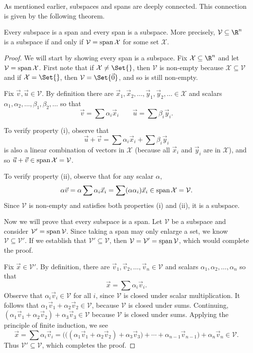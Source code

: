 As mentioned earlier, subspaces and spans are deeply connected.
This connection is given by the following theorem.

\begin{theorem}
	Every subspace is a span and every span is a subspace.  More precisely,
	$\mathcal V\subseteq \R^n$ is a subspace if and only if $\mathcal V=
	\operatorname{span}\mathcal X$ for some set $\mathcal X$.
\end{theorem}
\begin{proof}
	We will start by showing every span is a subspace.  Fix $\mathcal X\subseteq\R^n$
	and let
	$\mathcal V=\operatorname{span}\mathcal X$. First note that if $\mathcal X\neq \Set{}$, then $\mathcal V$
	is non-empty because $\mathcal X\subseteq\mathcal V$ and if $\mathcal X=\Set{}$, then $\mathcal V=\Set{\vec 0}$,
	and so is still non-empty.
	
	Fix $\vec v,\vec u\in\mathcal V$. By definition there are $\vec x_1,\vec x_2,\ldots,\vec y_1,\vec y_2,\ldots\in\mathcal X$ 
	and scalars $\alpha_1,\alpha_2,\ldots,\beta_1,\beta_2,\ldots$ so that
	\[
		\vec v=\sum \alpha_i\vec x_i\qquad \vec u=\sum\beta_i\vec y_i.
	\]

	To verify property (i), observe that
	\[
		\vec u+\vec v=\sum\alpha_i\vec x_i + \sum\beta_i\vec y_i
	\]
	is also a linear combination of vectors in $\mathcal X$ (because all $\vec x_i$ and $\vec y_i$
	are in $\mathcal X$), and so $\vec u+\vec v\in	\operatorname{span}\mathcal X=\mathcal V$.
	
	To verify property (ii), observe that for any scalar $\alpha$, 
	\[
		\alpha\vec v=\alpha\sum \alpha_i\vec x_i = \sum (\alpha\alpha_i)\vec x_i\in
		\operatorname{span}\mathcal X=\mathcal V.
	\]
	Since $\mathcal V$ is non-empty and satisfies both properties (i) and (ii), it is a subspace.

	Now we will prove that every subspace is a span. Let $\mathcal V$ be a subspace
	and consider $\mathcal V'=\operatorname{span}\mathcal V$.  Since taking a span may only enlarge a set, we know
	$\mathcal V\subseteq \mathcal V'$. If we establish that $\mathcal V'\subseteq\mathcal V$,
	then $\mathcal V=\mathcal V'=\operatorname{span}\mathcal V$, which would complete the proof.

	Fix $\vec x\in\mathcal V'$. By definition, there are $\vec v_1,\vec v_2,\ldots,\vec v_n\in\mathcal V$ and scalars
	$\alpha_1,\alpha_2,\ldots,\alpha_n$ so that
	\[
		\vec x=\sum \alpha_i\vec v_i.
	\]
	Observe that 
	$\alpha_i\vec v_i\in\mathcal V$ for all $i$, since $\mathcal V$ is closed under scalar
	multiplication. It follows that $\alpha_1\vec v_1+\alpha_2\vec v_2\in\mathcal V$,
	because $\mathcal V$ is closed under sums. Continuing, 
	$(\alpha_1\vec v_1+\alpha_2\vec v_2)+\alpha_3\vec v_3\in\mathcal V$ because
	$\mathcal V$ is closed under sums. Applying the principle of finite induction, we see
	\[
		\vec x=\sum \alpha_i\vec v_i
		=\Big(\big((\alpha_1\vec v_1+\alpha_2\vec v_2)
		+\alpha_3\vec v_3\big)+\cdots+\alpha_{n-1}\vec v_{n-1} \Big)
		+\alpha_n\vec v_n\in\mathcal V.
	\]
	Thus $\mathcal V'\subseteq\mathcal V$, which completes the proof.
\end{proof}


